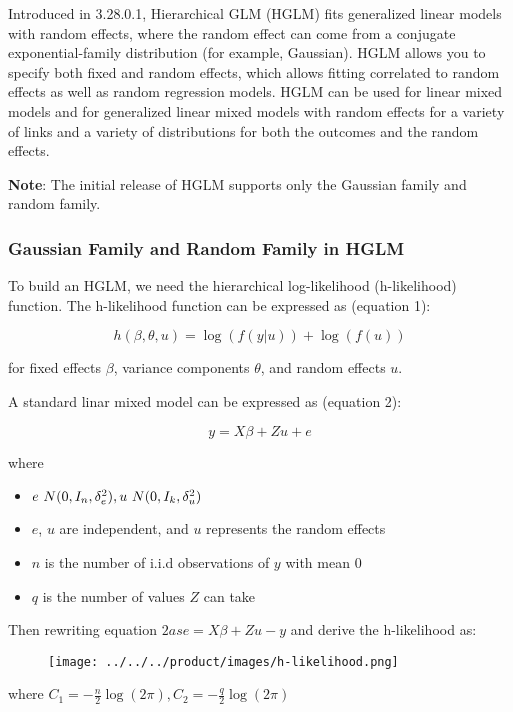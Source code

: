 Introduced in 3.28.0.1, Hierarchical GLM (HGLM) fits generalized linear models with random effects, where the random effect can come from a conjugate exponential-family distribution (for example, Gaussian). HGLM allows you to specify both fixed and random effects, which allows fitting correlated to random effects as well as random regression models. HGLM can be used for linear mixed models and for generalized linear mixed models with random effects for a variety of links and a variety of distributions for both the outcomes and the random effects.

\textbf{Note}: The initial release of HGLM supports only the Gaussian family and random family.

\subsubsection{Gaussian Family and Random Family in HGLM}

To build an HGLM, we need the hierarchical log-likelihood (h-likelihood) function. The h-likelihood function can be expressed as (equation 1):

$$h(\beta, \theta, u) = \log(f (y|u)) + \log (f(u))$$

for fixed effects $\beta$, variance components $\theta$, and random effects $u$.

A standard linar mixed model can be expressed as (equation 2):

$$y = X\beta + Zu + e$$

where

    \begin{itemize}
    \item  $e \text ~ N(0, I_n, \delta_e^2), u \text ~ N(0, I_k, \delta_u^2)$
    \item  $e$, $u$ are independent, and $u$ represents the random effects
    \item $n$ is the number of i.i.d observations of $y$ with mean $0$
    \item $q$ is the number of values $Z$ can take
    \end{itemize}
    
Then rewriting equation $2 as e = X\beta + Zu - y$ and derive the h-likelihood as:

\begin{figure}[H]
\centering
\texttt{[image: ../../../product/images/h-likelihood.png]}
\end{figure}

where $C_1 = - \frac{n}{2} \log(2\pi), C_2 = - \frac{q}{2} \log(2\pi)$

